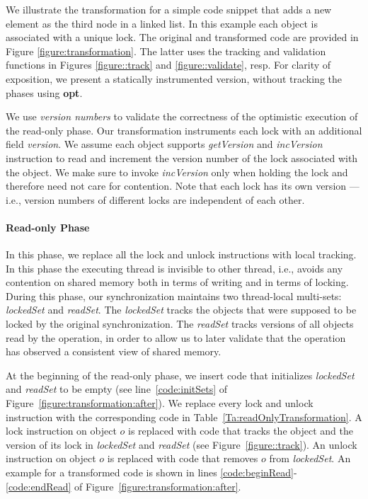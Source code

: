 We illustrate the transformation for a simple code snippet that adds a new element as the third node in a linked list. In this example each object is associated with a unique lock.
The original and transformed code are provided in Figure \ref{figure:transformation}. The latter uses
the tracking and validation functions in Figures \ref{figure::track} and
\ref{figure::validate}, resp.
For clarity of exposition, we present a statically instrumented version, without tracking the phases using \textbf{opt}.

We use \emph{version numbers} to validate the correctness of the optimistic execution of the read-only phase.
Our transformation instruments each lock with an additional field \emph{version}. We assume each object supports \emph{getVersion} and \emph{incVersion} instruction to read and increment the version number of the lock associated with the object. We make sure to invoke \emph{incVersion} only when holding the lock and therefore need not care for contention.
Note that each lock has its own version --- i.e., version numbers of different locks are independent of each other.

\paragraph{Read-only Phase}
In this phase, we replace all the lock and unlock instructions with local tracking. In this phase the executing thread is invisible to other thread, i.e., 
 avoids any contention on shared memory both in terms of writing and in terms of locking.
During this phase, our synchronization maintains two thread-local multi-sets: \emph{lockedSet} and \emph{readSet}.
The \emph{lockedSet} tracks the objects that were supposed to be locked by the original synchronization.
%
The \emph{readSet} tracks versions of all objects read by the
operation, in order to allow us to later validate that the operation has observed a consistent view of shared memory.

At the beginning of the read-only phase, we insert code that initializes \emph{lockedSet} and \emph{readSet} to be empty (see  line~\ref{code:initSets} of Figure~\ref{figure:transformation:after}).
We replace every lock and unlock instruction with the corresponding code in Table~\ref{Ta:readOnlyTransformation}.
A lock instruction on object $o$ is replaced with code that tracks the object and the version of its lock in
 \emph{lockedSet} and \emph{readSet} (see Figure~\ref{figure::track}).
An unlock instruction on object $o$ is replaced with code that removes $o$ from \emph{lockedSet}.
An example for a transformed code is shown in lines \ref{code:beginRead}-\ref{code:endRead} of Figure~\ref{figure:transformation:after}.

